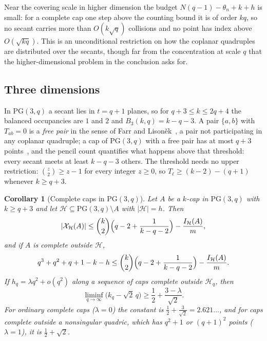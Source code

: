 \documentclass[11pt]{article}
\newtheorem{corollary}[theorem]{Corollary}
\theoremstyle{definition}
\theoremstyle{remark}
\newcommand{\PG}{\mathrm{PG}}
\newcommand{\cH}{\mathcal{H}}
\newcommand{\cX}{\mathcal{X}}
\newcommand{\IH}{I_{\cH}}
\begin{document}
Near the covering scale in higher dimension the budget
$N(q-1)-\theta_n+k+h$ is small: for a complete cap one step above the
counting bound it is of order $kq$, so no secant carries more than
$O(k\sqrt q)$ collisions and no point has index above $O(\sqrt{kq})$.
This is an unconditional restriction on how the coplanar quadruples are
distributed over the secants, though far from the concentration at scale
$q$ that the higher-dimensional problem in the conclusion asks for.

\subsection{Three dimensions}

In $\PG(3,q)$ a secant lies in $t=q+1$ planes, so for $q+3\le k\le2q+4$
the balanced occupancies are $1$ and $2$ and $B_3(k,q)=k-q-3$.  A pair
$\{a,b\}$ with $T_{ab}=0$ is a \emph{free pair} in the sense of Farr and
Lison\v{e}k~\cite{FarrLisonek2006}, a pair not participating in any
coplanar quadruple; a cap of $\PG(3,q)$ with a free pair has at most $q+3$
points~\cite[Theorem~2.3]{FarrLisonek2006}, and the pencil count
quantifies what happens above that threshold: every secant meets at least
$k-q-3$ others.  The threshold needs no upper restriction: $\binom z2\ge z-1$
for every integer $z\ge0$, so $T_\ell\ge(k-2)-(q+1)$ whenever $k\ge q+3$.

\begin{corollary}[Complete caps in \(\PG(3,q)\)]
\label{cor:pg3q-complete-caps}
Let $A$ be a $k$-cap in $\PG(3,q)$ with $k\ge q+3$ and let
$\cH\subseteq\PG(3,q)\setminus A$ with $|\cH|=h$.  Then
\begin{equation}
 |\cX_{\cH}(A)|\le
 \binom{k}{2}\Bigl(q-2+\frac1{k-q-2}\Bigr)-\frac{\IH(A)}m,
\label{eq:pg3q-coverage}
\end{equation}
and if $A$ is complete outside $\cH$,
\begin{equation}
 q^3+q^2+q+1-k-h\le
 \binom{k}{2}\Bigl(q-2+\frac1{k-q-2}\Bigr)-\frac{\IH(A)}m.
\label{eq:pg3q-complete}
\end{equation}
If $h_q=\lambda q^2+o(q^2)$ along a sequence of caps complete outside
$\cH_q$, then
\begin{equation}
 \liminf_{q\to\infty}\bigl(k_q-\sqrt2\,q\bigr)\ge\frac12+\frac{3-\lambda}{\sqrt2}.
\label{eq:pg3q-asymptotic}
\end{equation}
For ordinary complete caps ($\lambda=0$) the constant is
$\frac12+\frac3{\sqrt2}=2.621\ldots$, and for caps complete outside a
nonsingular quadric, which has $q^2+1$ or $(q+1)^2$ points ($\lambda=1$),
it is $\frac12+\sqrt2$.
\end{corollary}
\end{document}
